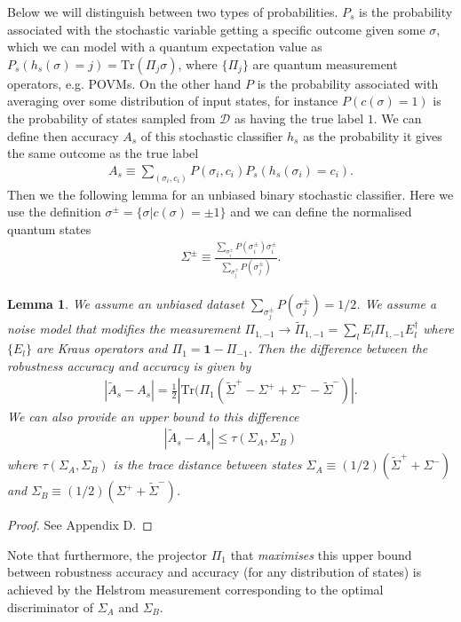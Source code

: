 \documentclass[onecolumn,prx, superscriptaddress,longbibliography,margin=1mm 11pt]{revtex4-2}
\newtheorem{lemma}[theorem]{Lemma}
\renewcommand{\mathbf}[1]{\boldsymbol{#1}}
\begin{document}
Below we will distinguish between two types of probabilities. $P_s$ is the probability associated with the stochastic variable getting a specific outcome given some $\sigma$, which we can model with a quantum expectation value as $P_s(h_s(\sigma)=j)=\text{Tr}(\Pi_j \sigma)$, where $\{\Pi_j\}$ are quantum measurement operators, e.g. POVMs. On the other hand $P$ is the probability associated with averaging over some distribution of input states, for instance $P(c(\sigma)=1)$ is the probability of states sampled from $\mathcal{D}$ as having the true label $1$. We can define then accuracy $A_s$ of this stochastic classifier $h_s$ as the probability it gives the same outcome as the true label
\begin{align}
    A_s \equiv \sum_{(\sigma_i, c_i)}P(\sigma_i, c_i)P_s(h_s(\sigma_i)=c_i). 
\end{align}
Then we the following lemma for an unbiased binary stochastic classifier. Here we use the definition $\sigma^{\pm}=\{\sigma| c(\sigma)=\pm 1\}$ and we can define the normalised quantum states 
\begin{align}
     \Sigma^{\pm} \equiv \frac{\sum_{\sigma_i^{\pm}}P(\sigma^{\pm}_i)\sigma_i^{\pm}}{\sum_{\sigma_j^{\pm}}P(\sigma^{\pm}_j)}. 
\end{align}
\begin{lemma}
    We assume an unbiased dataset $\sum_{\sigma_j^{\pm}}P(\sigma^{\pm}_j)=1/2$. We assume a noise model that modifies the measurement $\Pi_{1, -1} \rightarrow \tilde{\Pi}_{1, -1}=\sum_l E_l \Pi_{1, -1} E_l^{\dagger}$ where $\{E_l\}$ are Kraus operators and $\Pi_1=\mathbf{1}-\Pi_{-1}$. Then the difference between the robustness accuracy and accuracy is given by 
  \begin{align} \label{eq:asdifference1}
    |\tilde{A}_s-A_s|=\frac{1}{2}|\text{Tr}(\Pi_1(\tilde{\Sigma}^+-\Sigma^++\Sigma^--\tilde{\Sigma}^-)|.
\end{align}
We can also provide an upper bound to this difference
\begin{align}
    |\tilde{A}_s-A_s|\leq \tau(\Sigma_A, \Sigma_B)
\end{align}
where $\tau(\Sigma_A, \Sigma_B)$ is the trace distance between states $\Sigma_A \equiv (1/2)(\tilde{\Sigma}^++\Sigma^-)$ and $\Sigma_B \equiv (1/2)(\Sigma^++\tilde{\Sigma}^-)$. 
\end{lemma}
\begin{proof}
See Appendix D. 
\end{proof}
Note that furthermore, the projector $\Pi_1$ that \textit{maximises} this upper bound between robustness accuracy and accuracy (for any distribution of states) is achieved by the Helstrom measurement corresponding to the optimal discriminator of $\Sigma_A$ and $\Sigma_B$. \\
\end{document}
